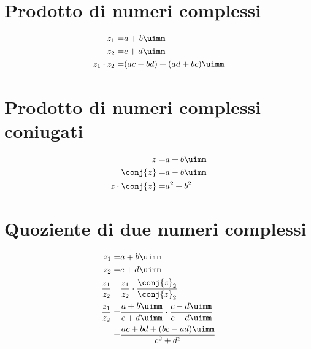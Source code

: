 \section{Prodotto di numeri complessi}
\begin{align*}
z_1=&a+b\uimm\\
z_2=&c+d\uimm\\
z_1\cdot z_2=&(ac-bd)+(ad+bc)\uimm
\end{align*}
\section{Prodotto di numeri complessi coniugati}
\begin{align*}
z=&a+b\uimm\\
\conj{z}=&a-b\uimm\\
z\cdot\conj{z}=&a^2+b^2
\end{align*}
\section{Quoziente di due numeri complessi}
\begin{align*}
z_1=&a+b\uimm\\
z_2=&c+d\uimm\\
\dfrac{z_1}{z_2}=&\dfrac{z_1}{z_2}\cdot\dfrac{\conj{z}_2}{\conj{z}_2}\\
\dfrac{z_1}{z_2}=&\dfrac{a+b\uimm}{c+d\uimm}\cdot\dfrac{c-d\uimm}{c-d\uimm}\\
=&\dfrac{ac+bd+(bc-ad)\uimm}{c^2+d^2}
\end{align*}
